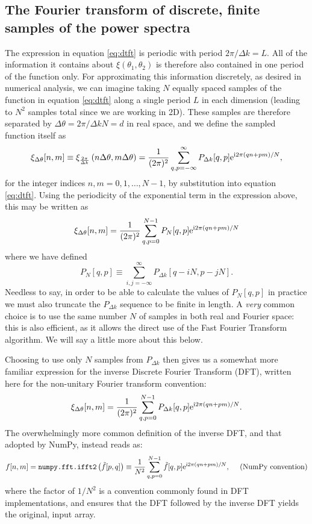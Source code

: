 \documentclass[preprint]{aastex}
\newcommand{\mi}{{\rm i}}
\newcommand{\me}{{\rm e}}
\begin{document}
\subsection{The Fourier transform of discrete, finite samples of the power spectra}
The expression in equation \eqref{eq:dtft} is periodic with period $2
\pi / \Delta k = L$.  All of the information it contains about
$\xi(\theta_1, \theta_2)$ is therefore also contained in one period
of the function only.  For approximating this information discretely, as desired in
numerical analysis, we can imagine taking $N$ equally spaced samples of
the function in equation \eqref{eq:dtft} along a single period $L$ in each
dimension (leading to $N^2$ samples total since we are working in 2D).
These samples are therefore separated by $\Delta \theta = 2 \pi /
\Delta k N = d$ in real space, and we define the sampled
function itself as
\begin{equation}
\xi_{\Delta \theta}[n, m] \equiv \xi_{\frac{2 \pi}{\Delta
    k}} \left( n \Delta \theta, m \Delta \theta \right) = \frac{1}{( 2 \pi)^2}
\sum_{q,p=-\infty}^{\infty} P_{\Delta k} [q, p] \me^{\mi 2 \pi (qn +
  pm) / N},
\end{equation}
for the integer indices $n, m = 0, 1, \ldots, N-1$, by substitution into equation
\eqref{eq:dtft}.  Using the periodicity of the exponential term in the
expression above, this may be written as
\begin{equation}
\xi_{\Delta \theta}[n, m] = \frac{1}{( 2 \pi)^2}
\sum_{q,p=0}^{N-1} P_N [q, p] \me^{\mi 2 \pi (qn +
  pm) / N}
\end{equation}
where we have defined
\begin{equation}
P_N[q, p] \equiv \sum_{i,j=-\infty}^{\infty}  P_{\Delta k} [q - i N, p
- j N] .
\end{equation}
Needless to say, in order to be able to calculate the values of
$P_N[q, p]$ in practice we must also truncate the 
$P_{\Delta k}$ sequence to be finite in length.  A \emph{very} common
choice is to use the same number $N$ of samples in both real and
Fourier space: this is also efficient, as it allows the direct use of
the Fast Fourier Transform algorithm.  We will say a little more about
this below.

Choosing to use only $N$
samples from $P_{\Delta k}$ then gives us a somewhat more
familiar expression for the inverse Discrete Fourier Transform (DFT),
written here for the non-unitary Fourier transform convention:
\begin{equation}
\xi_{\Delta \theta}[n, m] = \frac{1}{( 2 \pi)^2}
\sum_{q,p=0}^{N-1} P_{\Delta k} [q, p] \me^{\mi 2 \pi (qn +
  pm) / N}. \label{eq:dft}
\end{equation}
The overwhelmingly more common definition of the inverse DFT, and that adopted by
NumPy, instead reads as:
\begin{equation}
f[n, m] = \texttt{numpy.fft.ifft2}\left(\tilde{f}[p, q]\right) \equiv \frac{1}{N^2}
\sum_{q,p=0}^{N-1} \tilde{f}[q, p] \me^{\mi 2 \pi (qn +
  pm) / N} ,~~~~ (\textrm{NumPy convention}) \label{eq:dftnumpy}
\end{equation}
where the factor of $1/N^2$ is a convention commonly found in DFT
implementations, and ensures
that the DFT followed by the inverse DFT yields the original, input array.
\end{document}
